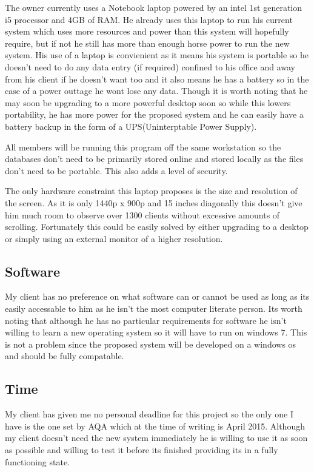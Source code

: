 The owner currently uses a Notebook laptop powered by an intel 1st generation i5 processor and 4GB of RAM. He already uses this laptop to run his current system which uses more resources and power than this system will hopefully require, but if not he still has more than enough horse power to run the new system. His use of a laptop is convienient as it means his system is portable so he doesn't need to do any data entry (if required) confined to his office and away from his client if he doesn't want too and it also means he has a battery so in the case of a power outtage he wont lose any data. Though it is worth noting that he may soon be upgrading to a more powerful desktop soon so while this lowers portability, he has more power for the proposed system and he can easily have a battery backup in the form of a UPS(Uninterptable Power Supply).

All members will be running this program off the same workstation so the databases don't need to be primarily stored online and stored locally as the files don't need to be portable. This also adds a level of security.

The only hardware constraint this laptop proposes is the size and resolution of the screen. As it is only 1440p x 900p and 15 inches diagonally this doesn't give him much room to observe over 1300 clients without excessive amounts of scrolling. Fortunately this could be easily solved by either upgrading to a desktop or simply using an external monitor of a higher resolution.

\subsection{Software}

My client has no preference on what software can or cannot be used as long as its easily accessable to him as he isn't the most computer literate person. Its worth noting that although he has no particular requirements for software he isn't willing to learn a new operating system so it will have to run on windows 7. This is not a problem since the proposed system will be developed on a windows os and should be fully compatable.

\subsection{Time}

My client has given me no personal deadline for this project so the only one I have is the one set by AQA which at the time of writing is April 2015. Although my client doesn't need the new system immediately he is willing to use it as soon as possible and willing to test it before its finished providing its in a fully functioning state.

